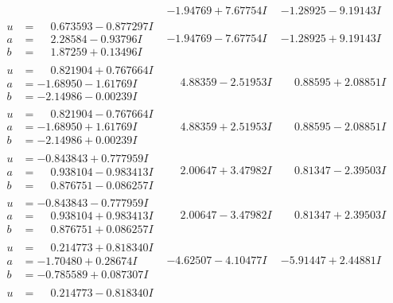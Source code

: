 \documentclass[1p]{elsarticle_modified}
\theoremstyle{definition}
\begin{document}
$$\begin{array}{c|c|c}
 & -1.94769 + 7.67754 I & -1.28925 - 9.19143 I \\ \hline\begin{aligned}
u &= \phantom{-}0.673593 - 0.877297 I \\
a &= \phantom{-}2.28584 - 0.93796 I \\
b &= \phantom{-}1.87259 + 0.13496 I\end{aligned}
 & -1.94769 - 7.67754 I & -1.28925 + 9.19143 I \\ \hline\begin{aligned}
u &= \phantom{-}0.821904 + 0.767664 I \\
a &= -1.68950 - 1.61769 I \\
b &= -2.14986 - 0.00239 I\end{aligned}
 & \phantom{-}4.88359 - 2.51953 I & \phantom{-}0.88595 + 2.08851 I \\ \hline\begin{aligned}
u &= \phantom{-}0.821904 - 0.767664 I \\
a &= -1.68950 + 1.61769 I \\
b &= -2.14986 + 0.00239 I\end{aligned}
 & \phantom{-}4.88359 + 2.51953 I & \phantom{-}0.88595 - 2.08851 I \\ \hline\begin{aligned}
u &= -0.843843 + 0.777959 I \\
a &= \phantom{-}0.938104 - 0.983413 I \\
b &= \phantom{-}0.876751 - 0.086257 I\end{aligned}
 & \phantom{-}2.00647 + 3.47982 I & \phantom{-}0.81347 - 2.39503 I \\ \hline\begin{aligned}
u &= -0.843843 - 0.777959 I \\
a &= \phantom{-}0.938104 + 0.983413 I \\
b &= \phantom{-}0.876751 + 0.086257 I\end{aligned}
 & \phantom{-}2.00647 - 3.47982 I & \phantom{-}0.81347 + 2.39503 I \\ \hline\begin{aligned}
u &= \phantom{-}0.214773 + 0.818340 I \\
a &= -1.70480 + 0.28674 I \\
b &= -0.785589 + 0.087307 I\end{aligned}
 & -4.62507 - 4.10477 I & -5.91447 + 2.44881 I \\ \hline\begin{aligned}
u &= \phantom{-}0.214773 - 0.818340 I \\

\end{aligned}
\end{array}$$
\end{document}
